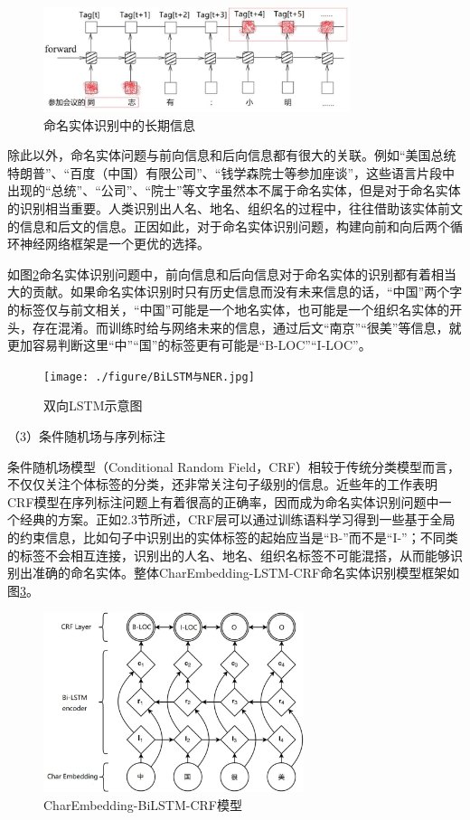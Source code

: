 \documentclass[winfonts,master,oneside,nobackinfo]{njuthesis}
\begin{document}
\begin{figure}[h]
\centering
\includegraphics[width=0.8\textwidth]{./figure/命名实体识别长期信息.jpg}
\caption{命名实体识别中的长期信息}
\label{simple_rnn}
\end{figure}

除此以外，命名实体问题与前向信息和后向信息都有很大的关联。例如“美国总统特朗普”、“百度（中国）有限公司”、“钱学森院士等参加座谈”，这些语言片段中出现的“总统”、“公司”、“院士”等文字虽然本不属于命名实体，但是对于命名实体的识别相当重要。人类识别出人名、地名、组织名的过程中，往往借助该实体前文的信息和后文的信息。正因如此，对于命名实体识别问题，构建向前和向后两个循环神经网络框架是一个更优的选择。

如图\ref{bilstm}命名实体识别问题中，前向信息和后向信息对于命名实体的识别都有着相当大的贡献。如果命名实体识别时只有历史信息而没有未来信息的话，“中国”两个字的标签仅与前文相关，“中国”可能是一个地名实体，也可能是一个组织名实体的开头，存在混淆。而训练时给与网络未来的信息，通过后文“南京”“很美”等信息，就更加容易判断这里“中”“国”的标签更有可能是“B-LOC”“I-LOC”。

\begin{figure}[h]
\centering
\texttt{[image: ./figure/BiLSTM与NER.jpg]}
\caption{双向LSTM示意图}
\label{bilstm}
\end{figure}

（3）条件随机场与序列标注

条件随机场模型（Conditional Random Field，CRF）相较于传统分类模型而言，不仅仅关注个体标签的分类，还非常关注句子级别的信息。近些年的工作表明CRF模型在序列标注问题上有着很高的正确率，因而成为命名实体识别问题中一个经典的方案。正如2.3节所述，CRF层可以通过训练语料学习得到一些基于全局的约束信息，比如句子中识别出的实体标签的起始应当是“B-”而不是“I-”；不同类的标签不会相互连接，识别出的人名、地名、组织名标签不可能混搭，从而能够识别出准确的命名实体。整体CharEmbedding-LSTM-CRF命名实体识别模型框架如图\ref{CE-BiLSTM-CRF}。

\begin{figure}[h]
\centering
\includegraphics[width=0.68\textwidth]{./figure/CE-LSTM-CRF.jpg}
\caption{CharEmbedding-BiLSTM-CRF模型}
\label{CE-BiLSTM-CRF}
\end{figure}
\end{document}
